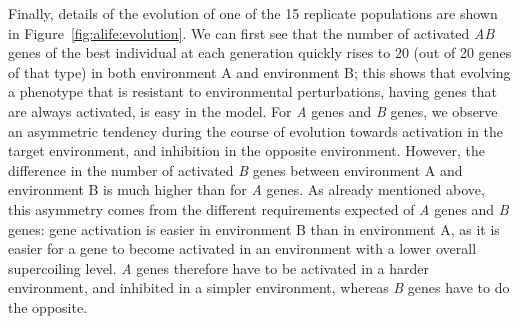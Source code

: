 Finally, details of the evolution of one of the 15 replicate populations are shown in Figure~\ref{fig:alife:evolution}.
We can first see that the number of activated \emph{AB} genes of the best individual at each generation quickly rises to 20 (out of 20 genes of that type) in both environment A and environment B; this shows that evolving a phenotype that is resistant to environmental perturbations, having genes that are always activated, is easy in the model.
For \emph{A} genes and \emph{B} genes, we observe an asymmetric tendency during the course of evolution towards activation in the target environment, and inhibition in the opposite environment.
However, the difference in the number of activated \emph{B} genes between environment A and environment B is much higher than for \emph{A} genes.
As already mentioned above, this asymmetry comes from the different requirements expected of \emph{A} genes and \emph{B} genes: gene activation is easier in environment B than in environment A, as it is easier for a gene to become activated in an environment with a lower overall supercoiling level.
\emph{A} genes therefore have to be activated in a harder environment, and inhibited in a simpler environment, whereas \emph{B} genes have to do the opposite.

